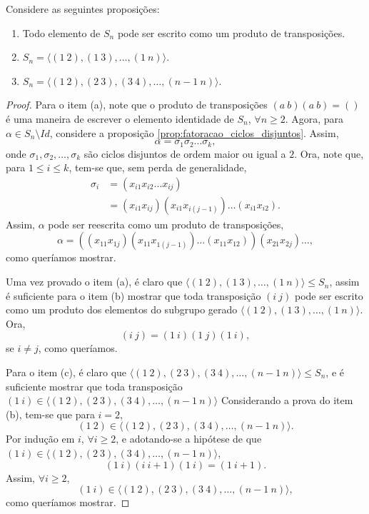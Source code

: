 \documentclass[11pt,openany]{book}
\newcommand{\gen}[1]{\ensuremath{\langle #1\rangle}}
\newenvironment{novo}{
    \color{red}
}{}
\begin{document}
\begin{novo}
\begin{proposition}
\label{prop:tres_prop_S_n_transposicoes}
    Considere as seguintes proposições:
    \begin{enumerate}[label=\alph*)]
        \item Todo elemento de $S_n$ pode ser escrito como um produto de transposições.
        \item $S_n = \gen{(1 \ 2), (1 \ 3), \dots, (1 \ n)}$.
        \item $S_n = \gen{(1 \ 2), (2 \ 3), (3 \ 4), \dots, (n-1 \ n)}$.
    \end{enumerate}
\end{proposition}
\begin{proof}
    Para o item (a), note que o produto de transposições $(a \ b) (a \ b) = ()$ é uma maneira de escrever o elemento identidade de $S_n$, $\forall n \geq 2$.
    Agora, para $\alpha \in S_n \setminus Id$, considere a proposição \ref{prop:fatoracao_ciclos_disjuntos}. Assim,
    \[\alpha = \sigma_1 \sigma_2 \dots \sigma_k,\]
    onde $\sigma_1, \sigma_2, \dots, \sigma_k$ são ciclos disjuntos de ordem maior ou igual a $2$.
    Ora, note que, para $1 \leq i \leq k$, tem-se que, sem perda de generalidade,
    \begin{align*}
        \sigma_i &= (x_{i1} x_{i2} \dots x_{ij}) \\
        &= (x_{i1} x_{ij}) (x_{i1} x_{i(j-1)}) \dots (x_{i1} x_{i2}).
    \end{align*}
    Assim, $\alpha$ pode ser reescrita como um produto de transposições,
    \[\alpha = ((x_{11} x_{1j}) (x_{11} x_{1(j-1)}) \dots (x_{11} x_{12})) (x_{21} x_{2j}) \dots,\]
    como queríamos mostrar.

    Uma vez provado o item (a), é claro que $\gen{(1 \ 2), (1 \ 3), \dots, (1 \ n)} \leq S_n$, assim é suficiente para o item (b) mostrar que toda transposição $(i \ j)$ pode ser escrito como um produto dos elementos do subgrupo gerado $\gen{(1 \ 2), (1 \ 3), \dots, (1 \ n)}$. Ora,
    \[(i \ j) = (1 \ i) (1 \ j) (1 \ i),\]
    se $i \not= j$, como queríamos.

    Para o item (c), é claro que $\gen{(1 \ 2), (2 \ 3), (3 \ 4), \dots, (n-1 \ n)} \leq S_n$, e é suficiente mostrar que toda transposição $(1 \ i) \in \gen{(1 \ 2), (2 \ 3), (3 \ 4), \dots, (n-1 \ n)}$ Considerando a prova do item (b), tem-se que para $i = 2$,
    \[(1 \ 2) \in \gen{(1 \ 2), (2 \ 3), (3 \ 4), \dots, (n-1 \ n)}.\]
    Por indução em $i$, $\forall i \geq 2$, e adotando-se a hipótese de que $(1 \ i) \in \gen{(1 \ 2), (2 \ 3), (3 \ 4), \dots, (n-1 \ n)}$,
    \[(1 \ i) (i \ i+1) (1 \ i) = (1 \ i+1).\]
    Assim, $\forall i \geq 2$,
    \[(1 \ i) \in \gen{(1 \ 2), (2 \ 3), (3 \ 4), \dots, (n-1 \ n)},\]
    como queríamos mostrar.
\end{proof}


\end{novo}
\end{document}
